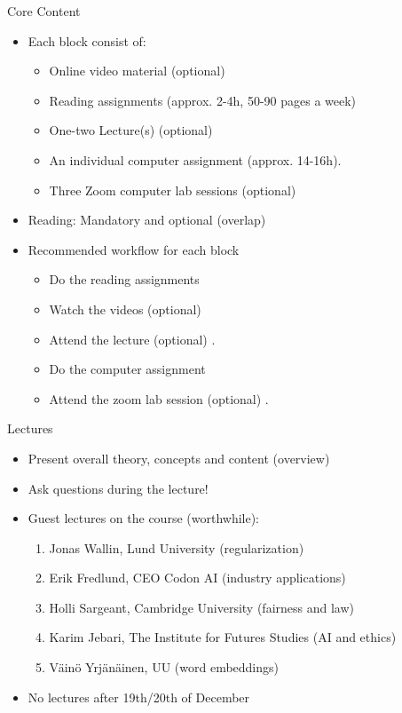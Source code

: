 \documentclass[10pt]{beamer}
\begin{document}
\begin{frame}{Core Content}

\begin{itemize}
\item Each block consist of:
\begin{itemize}
\item Online video material (optional)
\item Reading assignments (approx. 2-4h, 50-90 pages a week)
\item One-two Lecture(s) (optional)
\item An individual computer assignment (approx. 14-16h).
\item Three Zoom computer lab sessions (optional)\pause
\end{itemize}
\item Reading: Mandatory and optional (overlap)\pause
\item Recommended workflow for each block
\begin{itemize}
\item Do the reading assignments
\item Watch the videos (optional)
\item Attend the lecture (optional) .
\item Do the computer assignment
\item Attend the zoom lab session (optional) .
\end{itemize}
\end{itemize}
\end{frame}


\begin{frame}{Lectures}

\begin{itemize}
\item Present overall theory, concepts and content (overview) \pause
\item Ask questions during the lecture!
\item Guest lectures on the course (worthwhile):
\begin{enumerate}
\item Jonas Wallin, Lund University (regularization)\pause
\item Erik Fredlund, CEO Codon AI (industry applications)\pause
\item Holli Sargeant, Cambridge University (fairness and law)\pause
\item Karim Jebari, The Institute for Futures Studies (AI and ethics)\pause
\item Väinö Yrjänäinen, UU (word embeddings) \pause
\end{enumerate}
\item No lectures after 19th/20th of December
\end{itemize}
\end{frame}
\end{document}
